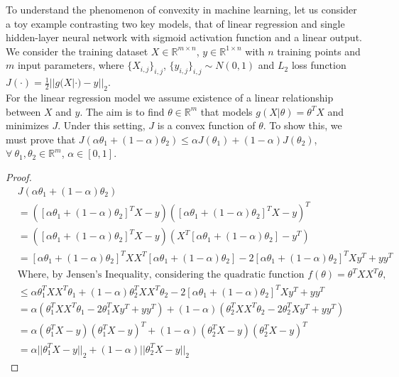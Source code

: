 \documentclass{article}
\newcommand{\rnums}{\mathbb{R}}
\begin{document}
	To understand the phenomenon of convexity in machine learning, let us consider a toy example contrasting two key models, that of linear regression and single hidden-layer neural network with sigmoid activation function and a linear output. We consider the training dataset $X\in\rnums^{m\times n}$, $y\in\rnums^{1\times n}$ with $n$ training points and $m$ input parameters, where $\{X_{i,j}\}_{i,j}$, $\{y_{i,j}\}_{i,j} \sim N(0,1)$ and $L_2$ loss function $J(\cdot) = \frac{1}{2} ||g(X|\cdot) - y||_2$.\\
		
	For the linear regression model we assume existence of a linear relationship between $X$ and $y$. The aim is to find $\theta\in\rnums^{m}$ that models $g(X|\theta) = \theta^T X$ and minimizes $J$. Under this setting, $J$ is a convex function of $\theta$. To show this, we must prove that $J(\alpha \theta_1 + (1 - \alpha)\theta_2) \leq \alpha J(\theta_1) + (1 - \alpha)J(\theta_2)$, $\forall \  \theta_1, \theta_2 \in \rnums^{m}$, $\alpha \in [0,1]$.
	
	\begin{proof}
	\begin{align*}
		&J(\alpha \theta_1 + (1 - \alpha)\theta_2) \\
		&= ([\alpha \theta_1 + (1 - \alpha)\theta_2]^TX -y)([\alpha \theta_1 + (1 - \alpha)\theta_2]^TX -y)^T\\
		&= ([\alpha \theta_1 + (1 - \alpha)\theta_2]^TX -y)(X^T[\alpha \theta_1 + (1 - \alpha)\theta_2] -y^T)\\
		&= [\alpha\theta_1 + (1-\alpha)\theta_2]^TXX^T[\alpha\theta_1 + (1-\alpha)\theta_2] - 2[\alpha\theta_1 + (1-\alpha)\theta_2]^TXy^T + yy^T\\
		&\text{Where, by Jensen's Inequality, considering the quadratic function $f(\theta) = \theta^TXX^T\theta$,}\\
		&\leq \alpha \theta_1^TXX^T\theta_1 + (1 - \alpha) \theta_2^TXX^T\theta_2 - 2[\alpha\theta_1 + (1-\alpha)\theta_2]^TXy^T + yy^T\\
		&= \alpha(\theta_1^TXX^T\theta_1 - 2\theta_1^TXy^T + yy^T) + (1 - \alpha)(\theta_2^TXX^T\theta_2 - 2\theta_2^TXy^T + yy^T) \\
		&= \alpha(\theta_1^TX - y)(\theta_1^TX - y)^T + (1 - \alpha)(\theta_2^TX - y)(\theta_2^TX - y)^T\\
		&= \alpha ||\theta_1^TX - y||_2 + (1 - \alpha) ||\theta_2^TX - y||_2
	\end{align*}
	\end{proof}
	
\end{document}
